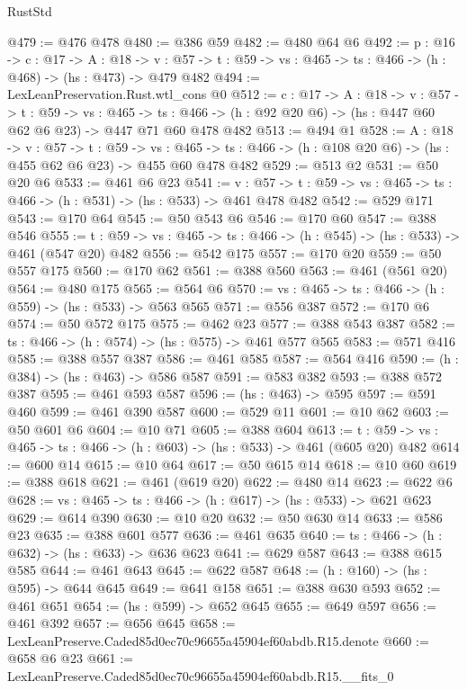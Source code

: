 \begin{lexlean}{RustStd}
\begin{coremodule}
@479 := @476 @478
@480 := @386 @59
@482 := @480 @64 @6
@492 := {p : @16} ->
  {c : @17} ->
  {A : @18} ->
  {v : @57} -> {t : @59} -> {vs : @465} -> {ts : @466} -> (h : @468) -> (hs : @473) -> @479 @482
@494 := LexLeanPreservation.Rust.wtl_cons @0
@512 := {c : @17} ->
  {A : @18} ->
  {v : @57} ->
  {t : @59} ->
  {vs : @465} ->
  {ts : @466} -> (h : @92 @20 @6) -> (hs : @447 @60 @62 @6 @23) -> @447 @71 @60 @478 @482
@513 := @494 @1
@528 := {A : @18} ->
  {v : @57} ->
  {t : @59} ->
  {vs : @465} -> {ts : @466} -> (h : @108 @20 @6) -> (hs : @455 @62 @6 @23) -> @455 @60 @478 @482
@529 := @513 @2
@531 := @50 @20 @6
@533 := @461 @6 @23
@541 := {v : @57} ->
  {t : @59} -> {vs : @465} -> {ts : @466} -> (h : @531) -> (hs : @533) -> @461 @478 @482
@542 := @529 @171
@543 := @170 @64
@545 := @50 @543 @6
@546 := @170 @60
@547 := @388 @546
@555 := {t : @59} -> {vs : @465} -> {ts : @466} -> (h : @545) -> (hs : @533) -> @461 (@547 @20) @482
@556 := @542 @175
@557 := @170 @20
@559 := @50 @557 @175
@560 := @170 @62
@561 := @388 @560
@563 := @461 (@561 @20)
@564 := @480 @175
@565 := @564 @6
@570 := {vs : @465} -> {ts : @466} -> (h : @559) -> (hs : @533) -> @563 @565
@571 := @556 @387
@572 := @170 @6
@574 := @50 @572 @175
@575 := @462 @23
@577 := @388 @543 @387
@582 := {ts : @466} -> (h : @574) -> (hs : @575) -> @461 @577 @565
@583 := @571 @416
@585 := @388 @557 @387
@586 := @461 @585
@587 := @564 @416
@590 := (h : @384) -> (hs : @463) -> @586 @587
@591 := @583 @382
@593 := @388 @572 @387
@595 := @461 @593 @587
@596 := (hs : @463) -> @595
@597 := @591 @460
@599 := @461 @390 @587
@600 := @529 @11
@601 := @10 @62
@603 := @50 @601 @6
@604 := @10 @71
@605 := @388 @604
@613 := {t : @59} -> {vs : @465} -> {ts : @466} -> (h : @603) -> (hs : @533) -> @461 (@605 @20) @482
@614 := @600 @14
@615 := @10 @64
@617 := @50 @615 @14
@618 := @10 @60
@619 := @388 @618
@621 := @461 (@619 @20)
@622 := @480 @14
@623 := @622 @6
@628 := {vs : @465} -> {ts : @466} -> (h : @617) -> (hs : @533) -> @621 @623
@629 := @614 @390
@630 := @10 @20
@632 := @50 @630 @14
@633 := @586 @23
@635 := @388 @601 @577
@636 := @461 @635
@640 := {ts : @466} -> (h : @632) -> (hs : @633) -> @636 @623
@641 := @629 @587
@643 := @388 @615 @585
@644 := @461 @643
@645 := @622 @587
@648 := (h : @160) -> (hs : @595) -> @644 @645
@649 := @641 @158
@651 := @388 @630 @593
@652 := @461 @651
@654 := (hs : @599) -> @652 @645
@655 := @649 @597
@656 := @461 @392
@657 := @656 @645
@658 := LexLeanPreserve.Caded85d0ec70c96655a45904ef60abdb.R15.denote
@660 := @658 @6 @23
@661 := LexLeanPreserve.Caded85d0ec70c96655a45904ef60abdb.R15.__fits_0

\end{coremodule}
\end{lexlean}

